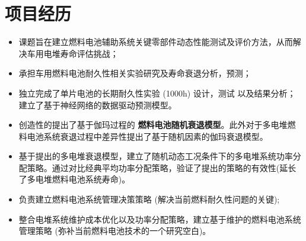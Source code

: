 \documentclass{resume}
\begin{document}
\section{项目经历}
\begin{itemize}
  \item 课题旨在建立燃料电池辅助系统关键零部件动态性能测试及评价方法，从而解决车用电堆寿命评估挑战；
  \item 承担车用燃料电池耐久性相关实验研究及寿命衰退分析，预测；
  \item 独立完成了单片电池的长期耐久性实验 (1000h) 设计，测试 以及结果分析；建立了基于神经网络的数据驱动预测模型。
\end{itemize}
\begin{itemize}
  \item 创造性的提出了基于伽玛过程的 \textbf{燃料电池随机衰退模型}。此外对于多电堆燃料电池系统衰退过程中差异性提出了基于随机因素的伽玛衰退模型。
  \item 基于提出的多电堆衰退模型，建立了随机动态工况条件下的多电堆系统功率分配策略。通过对比经典平均功率分配策略，验证了提出的策略的有效性(延长了多电堆燃料电池系统寿命)。
\end{itemize}

\begin{itemize}
  \item 负责建立燃料电池系统管理决策策略 (解决当前燃料耐久性问题的关键);
  \item 整合电堆系统维护成本优化以及功率分配策略，建立基于维护的燃料电池系统管理策略 (弥补当前燃料电池技术的一个研究空白)。
\end{itemize}


\end{document}

